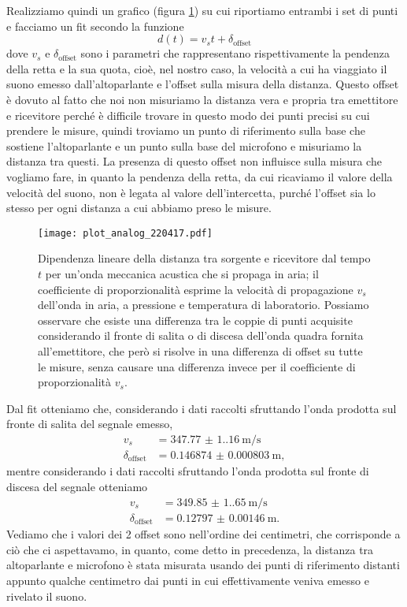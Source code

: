 \documentclass[
    prl,
    reprint, 
    superscriptaddress, 
    altaffilletter, 
    amsmath, 
    amssymb, 
    a4paper,
    varvw]{revtex4-2}
\begin{document}
Realizziamo quindi un grafico (figura \ref{fig:analog_plot_d1}) su cui riportiamo entrambi i set di punti e facciamo un fit secondo la funzione \begin{equation}
    d(t)=v_s t+\delta_\text{offset}
\end{equation} dove $v_s$ e $\delta_\text{offset}$ sono i parametri che rappresentano rispettivamente la pendenza della retta e la sua quota, cioè, nel nostro caso, la velocità a cui ha viaggiato il suono emesso dall'altoparlante e l'offset sulla misura della distanza. Questo offset è dovuto al fatto che noi non misuriamo la distanza vera e propria tra emettitore e ricevitore perché è difficile trovare in questo modo dei punti precisi su cui prendere le misure, quindi troviamo un punto di riferimento sulla base che sostiene l'altoparlante e un punto sulla base del microfono e misuriamo la distanza tra questi. La presenza di questo offset non influisce sulla misura che vogliamo fare, in quanto la pendenza della retta, da cui ricaviamo il valore della velocità del suono, non è legata al valore dell'intercetta, purché l'offset sia lo stesso per ogni distanza a cui abbiamo preso le misure.

\begin{figure}[!t]
    \centering
    \texttt{[image: plot\_analog\_220417.pdf]}
    \caption{Dipendenza lineare della distanza tra sorgente e ricevitore dal tempo $t$ per un'onda meccanica acustica che si propaga in aria; il coefficiente di proporzionalità esprime la velocità di propagazione $v_s$ dell'onda in aria, a pressione e temperatura di laboratorio. Possiamo osservare che esiste una differenza tra le coppie di punti acquisite considerando il fronte di salita o di discesa dell'onda quadra fornita all'emettitore, che però si risolve in una differenza di offset su tutte le misure, senza causare una differenza invece per il coefficiente di proporzionalità $v_s$.}\label{fig:analog_plot_d1}
\end{figure}

Dal fit otteniamo che, considerando i dati raccolti sfruttando l'onda prodotta sul fronte di salita del segnale emesso, \begin{align*}
    v_s &=\SI{347.77(1.16)}{\metre\per\second}\\
    \delta_\text{offset} &=\SI{0.146874(803)}{\metre},
\end{align*} mentre considerando i dati raccolti sfruttando l'onda prodotta sul fronte di discesa del segnale otteniamo \begin{align*}
    v_s &=\SI{349.85(1.65)}{\metre\per\second}\\
    \delta_\text{offset} &=\SI{0.12797(146)}{\metre}.
\end{align*}
Vediamo che i valori dei 2 offset sono nell'ordine dei centimetri, che corrisponde a ciò che ci aspettavamo, in quanto, come detto in precedenza, la distanza tra altoparlante e microfono è stata misurata usando dei punti di riferimento distanti appunto qualche centimetro dai punti in cui effettivamente veniva emesso e rivelato il suono. 
\end{document}
